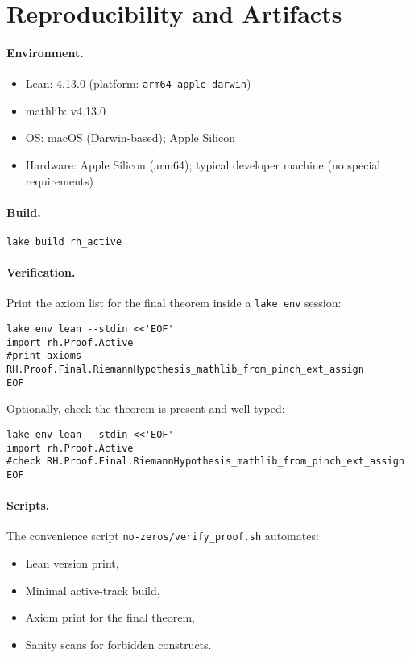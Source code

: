 \documentclass[11pt]{article}
\theoremstyle{plain}
\theoremstyle{definition}
\begin{document}
\section{Reproducibility and Artifacts}
\label{sec:artifact}

\paragraph{Environment.}
\begin{itemize}
  \item Lean: 4.13.0 (platform: \texttt{arm64-apple-darwin})
  \item mathlib: v4.13.0
  \item OS: macOS (Darwin-based); Apple Silicon
  \item Hardware: Apple Silicon (arm64); typical developer machine (no special requirements)
\end{itemize}

\paragraph{Build.}
\begin{verbatim}
lake build rh_active
\end{verbatim}

\paragraph{Verification.}
Print the axiom list for the final theorem inside a \texttt{lake env} session:
\begin{verbatim}
lake env lean --stdin <<'EOF'
import rh.Proof.Active
#print axioms RH.Proof.Final.RiemannHypothesis_mathlib_from_pinch_ext_assign
EOF
\end{verbatim}
Optionally, check the theorem is present and well-typed:
\begin{verbatim}
lake env lean --stdin <<'EOF'
import rh.Proof.Active
#check RH.Proof.Final.RiemannHypothesis_mathlib_from_pinch_ext_assign
EOF
\end{verbatim}

\paragraph{Scripts.}
The convenience script \texttt{no-zeros/verify\_proof.sh} automates:
\begin{itemize}
  \item Lean version print,
  \item Minimal active-track build,
  \item Axiom print for the final theorem,
  \item Sanity scans for forbidden constructs.
\end{itemize}
\end{document}
